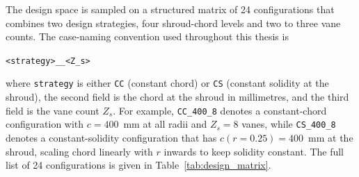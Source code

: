The design space is sampled on a structured matrix of 24 configurations that combines two design strategies, four shroud-chord levels and two to three vane counts. The case-naming convention used throughout this thesis is
 
\medskip
\centerline{\texttt{<strategy>\_<chord shroud in mm>\_<Z\_s>}}
\medskip
 
\noindent
where \texttt{strategy} is either \texttt{CC} (constant chord) or \texttt{CS} (constant solidity at the shroud), the second field is the chord at the shroud in millimetres, and the third field is the vane count $Z_s$. For example, \texttt{CC\_400\_8} denotes a constant-chord configuration with $c = 400$~mm at all radii and $Z_s = 8$ vanes, while \texttt{CS\_400\_8} denotes a constant-solidity configuration that has $c(r=0.25) = 400$~mm at the shroud, scaling chord linearly with $r$ inwards to keep solidity constant. The full list of 24 configurations is given in Table~\ref{tab:design_matrix}.
 
